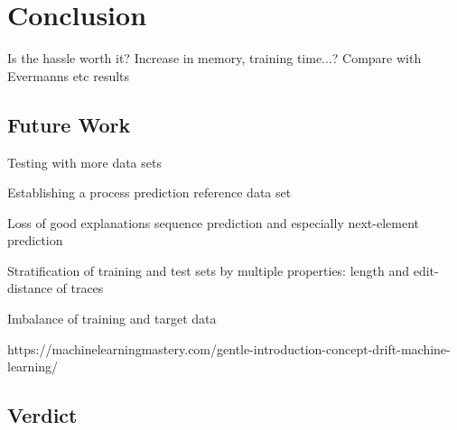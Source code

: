 \chapter{Conclusion} \label{chap:conclusion}
Is the hassle worth it?
Increase in memory, training time...?
Compare with Evermanns etc results

\section{Future Work} \label{sec:conclusion:future-work}
Testing with more data sets

Establishing a process prediction reference data set

Loss of good explanations sequence prediction and especially next-element prediction

Stratification of training and test sets by multiple properties: length and edit-distance of traces

Imbalance of training and target data

https://machinelearningmastery.com/gentle-introduction-concept-drift-machine-learning/

\section{Verdict} \label{sec:conclusion:verdict}
